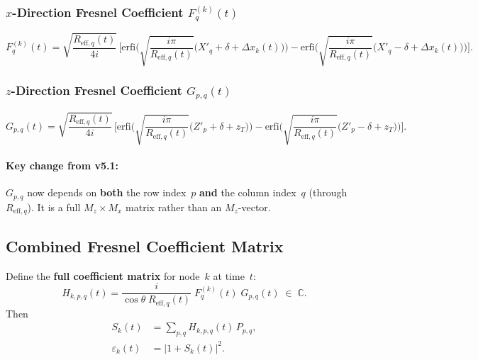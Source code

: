 \documentclass[11pt,a4paper]{article}
\newcommand{\C}{\mathbb{C}}
\newcommand{\erfi}{\mathrm{erfi}}
\begin{document}
\subsubsection{$x$-Direction Fresnel Coefficient $F_q^{(k)}(t)$}
\begin{equation}
  F_q^{(k)}(t)
  = \sqrt{\frac{R_{\mathrm{eff},q}(t)}{4i}}\,\biggl[
    \erfi\!\biggl(\sqrt{\frac{i\pi}{R_{\mathrm{eff},q}(t)}}
    \bigl(X'_q{+}\delta{+}\Delta x_k(t)\bigr)\biggr)
  - \erfi\!\biggl(\sqrt{\frac{i\pi}{R_{\mathrm{eff},q}(t)}}
    \bigl(X'_q{-}\delta{+}\Delta x_k(t)\bigr)\biggr)\biggr].
  \label{eq:Fq}
\end{equation}

\subsubsection{$z$-Direction Fresnel Coefficient $G_{p,q}(t)$}
\begin{equation}
  G_{p,q}(t)
  = \sqrt{\frac{R_{\mathrm{eff},q}(t)}{4i}}\,\biggl[
    \erfi\!\biggl(\sqrt{\frac{i\pi}{R_{\mathrm{eff},q}(t)}}
    \bigl(Z'_p{+}\delta{+}z_T\bigr)\biggr)
  - \erfi\!\biggl(\sqrt{\frac{i\pi}{R_{\mathrm{eff},q}(t)}}
    \bigl(Z'_p{-}\delta{+}z_T\bigr)\biggr)\biggr].
  \label{eq:Gpq}
\end{equation}

\paragraph{Key change from v5.1:} $G_{p,q}$ now depends on
\textbf{both} the row index~$p$ \textbf{and} the column index~$q$
(through $R_{\mathrm{eff},q}$).  It is a full $M_z\times M_x$ matrix
rather than an $M_z$-vector.

\subsection{Combined Fresnel Coefficient Matrix}

Define the \textbf{full coefficient matrix} for node~$k$ at time~$t$:
\begin{equation}
  H_{k,p,q}(t) = \frac{i}{\cos\theta\;R_{\mathrm{eff},q}(t)}\;
  F_q^{(k)}(t)\;G_{p,q}(t)
  \;\in\;\C.
  \label{eq:H_matrix}
\end{equation}
Then
\begin{align}
  S_k(t) &= \sum_{p,q} H_{k,p,q}(t)\,P_{p,q},
  \label{eq:Sk}\\
  \varepsilon_k(t) &= |1 + S_k(t)|^2. \label{eq:eps_from_S}
\end{align}
\end{document}
